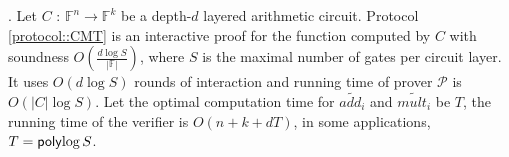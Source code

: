 \begin{theorem}\cite{VSA13}\cite{JT_Thesis}\cite{CMT}\cite{GKR}. Let $C$ : $\mathbb{F}^n \rightarrow \mathbb{F}^k$ be a depth-$d$ layered arithmetic circuit. Protocol \ref{protocol::CMT} is an interactive proof for the function computed by $C$ with soundness $O(\frac{d\log {S}}{|\mathbb{F}|})$, where $S$ is the maximal number of gates per circuit layer. It uses $O(d \log S)$ rounds of interaction and running time of prover $\mathcal{P}$ is $O(|C|\log S)$. Let the optimal computation time for $\tilde{add_i}$ and $\tilde{mult_i}$ be $T$, the running time of the verifier is $O(n+k+dT)$, in some applications, $T={\sf poly}{\log S}$.
\end{theorem}